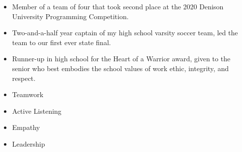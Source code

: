 





\smallskip
\begin{itemize}
\item Member of a team of four that took second place at the 2020 Denison University Programming Competition.
\item Two-and-a-half year captain of my high school varsity soccer team, led the team to our first ever state final.
\item Runner-up in high school for the Heart of a Warrior award, given to the senior who best embodies the school values of work ethic, integrity, and respect.
\end{itemize}
\begin{itemize}
    \item Teamwork
    \item Active Listening
    \item Empathy
    \item Leadership
\end{itemize}
\cvproject{}